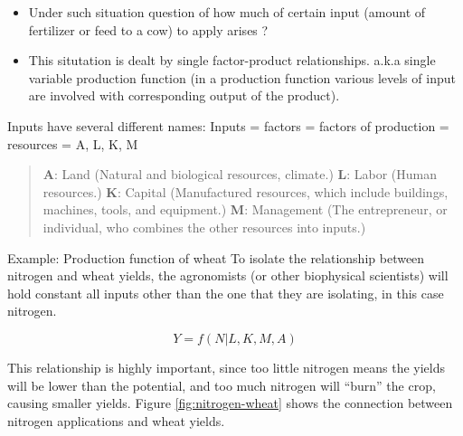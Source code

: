 \documentclass[12pt,ignorenonframetext,aspectratio=169]{beamer}
\providecommand{\tightlist}{%
  \setlength{\itemsep}{0pt}\setlength{\parskip}{0pt}}
\begin{document}
\begin{frame}{}
\protect\hypertarget{section}{}
\begin{itemize}
\tightlist
\item
  Under such situation question of how much of certain input (amount of
  fertilizer or feed to a cow) to apply arises ?
\item
  This situtation is dealt by single factor-product relationships. a.k.a
  single variable production function (in a production function various
  levels of input are involved with corresponding output of the
  product).
\end{itemize}

\begin{block}{Inputs have several different names:}
\protect\hypertarget{inputs-have-several-different-names}{}
Inputs = factors = factors of production = resources = A, L, K, M

\begin{quote}
\textbf{A}: Land (Natural and biological resources, climate.)
\newline \textbf{L}: Labor (Human resources.) \newline \textbf{K}:
Capital (Manufactured resources, which include buildings, machines,
tools, and equipment.) \newline \textbf{M}: Management (The
entrepreneur, or individual, who combines the other resources into
inputs.)
\end{quote}
\end{block}
\end{frame}

\begin{frame}{Example: Production function of wheat}
\protect\hypertarget{example-production-function-of-wheat}{}
To isolate the relationship between nitrogen and wheat yields, the
agronomists (or other biophysical scientists) will hold constant all
inputs other than the one that they are isolating, in this case
nitrogen.

\[Y = f(N | L, K, M, A)\]

This relationship is highly important, since too little nitrogen means
the yields will be lower than the potential, and too much nitrogen will
``burn'' the crop, causing smaller yields. Figure
\ref{fig:nitrogen-wheat} shows the connection between nitrogen
applications and wheat yields.
\end{frame}
\end{document}
